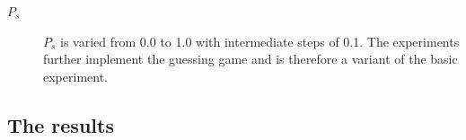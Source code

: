 \begin{description}
\item[$P_s$] $P_s$ is varied from 0.0 to 1.0 with intermediate steps of 0.1. The experiments further implement the guessing game and is therefore a variant of the basic experiment.
\end{description}

\subsection{The results}

\begin{figure}
\centering
{}
\\
\\

\end{figure}
